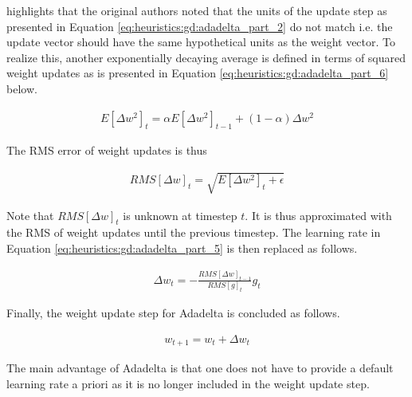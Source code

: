 \citeauthor{ref:ruder:2016}\cite{ref:ruder:2016} highlights that the original authors \cite{ref:zeiler:2012} noted that the units of the update step as presented in Equation \ref{eq:heuristics:gd:adadelta_part_2} do not match i.e. the update vector should have the same hypothetical units as the weight vector. To realize this, another exponentially decaying average is defined in terms of squared weight updates as is presented in Equation \ref{eq:heuristics:gd:adadelta_part_6} below.

\begin{equation}
    \label{eq:heuristics:gd:adadelta_part_6}
    \begin{split}
        E[\Delta w^{2}]_{t} = \alpha E[\Delta w^{2}]_{t - 1} + (1 - \alpha)\Delta w^{2}
    \end{split}
\end{equation}

The \ac{RMS} error of weight updates is thus

\begin{equation}
    \label{eq:heuristics:gd:adadelta_part_7}
    \begin{split}
        RMS[\Delta w]_{t} = \sqrt{E[\Delta w^{2}]_{t} + \epsilon}
    \end{split}
\end{equation}

Note that $RMS[\Delta w]_{t}$ is unknown at timestep $t$. It is thus approximated with the \ac{RMS} of weight updates until the previous timestep. The learning rate in Equation \ref{eq:heuristics:gd:adadelta_part_5} is then replaced as follows.

\begin{equation}
    \label{eq:heuristics:gd:adadelta_part_8}
    \begin{split}
        \Delta w_{t} = - \frac{RMS[\Delta w]_{t-1}}{RMS[g]_{t}} g_{t}
    \end{split}
\end{equation}

Finally, the weight update step for \ac{Adadelta} is concluded as follows.

\begin{equation}
    \label{eq:heuristics:gd:adadelta_part_9}
    \begin{split}
        w_{t+1} = w_{t} + \Delta w_{t}
    \end{split}
\end{equation}

The main advantage of \ac{Adadelta} is that one does not have to provide a default learning rate a priori as it is no longer included in the weight update step.

